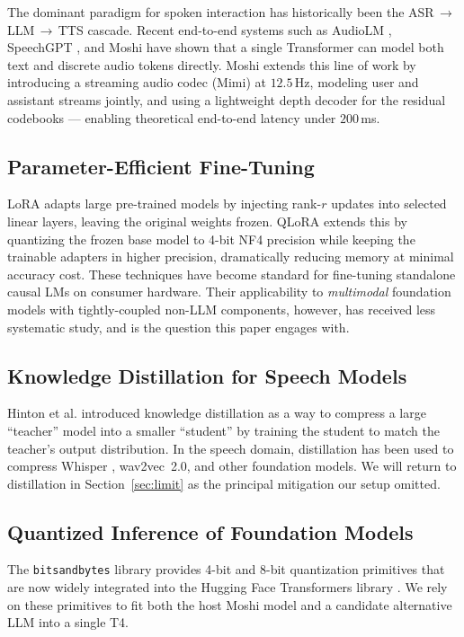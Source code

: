 \documentclass[conference]{IEEEtran}
\begin{document}
The dominant paradigm for spoken interaction has historically been the ASR\,$\to$\,LLM\,$\to$\,TTS cascade. Recent end-to-end systems such as AudioLM \cite{audiolm2023}, SpeechGPT \cite{speechgpt2023}, and Moshi \cite{moshi2024} have shown that a single Transformer can model both text and discrete audio tokens directly. Moshi extends this line of work by introducing a streaming audio codec (Mimi) at $12.5$\,Hz, modeling user and assistant streams jointly, and using a lightweight depth decoder for the residual codebooks --- enabling theoretical end-to-end latency under $200$\,ms.

\subsection{Parameter-Efficient Fine-Tuning}

LoRA \cite{lora2021} adapts large pre-trained models by injecting rank-$r$ updates into selected linear layers, leaving the original weights frozen. QLoRA \cite{qlora2023} extends this by quantizing the frozen base model to 4-bit NF4 precision while keeping the trainable adapters in higher precision, dramatically reducing memory at minimal accuracy cost. These techniques have become standard for fine-tuning standalone causal LMs on consumer hardware. Their applicability to \emph{multimodal} foundation models with tightly-coupled non-LLM components, however, has received less systematic study, and is the question this paper engages with.

\subsection{Knowledge Distillation for Speech Models}

Hinton et al. \cite{kd2015} introduced knowledge distillation as a way to compress a large ``teacher'' model into a smaller ``student'' by training the student to match the teacher's output distribution. In the speech domain, distillation has been used to compress Whisper \cite{whisper2023}, wav2vec~2.0, and other foundation models. We will return to distillation in Section~\ref{sec:limit} as the principal mitigation our setup omitted.

\subsection{Quantized Inference of Foundation Models}

The \texttt{bitsandbytes} library \cite{bitsandbytes2022} provides 4-bit and 8-bit quantization primitives that are now widely integrated into the Hugging Face Transformers library \cite{transformers2020}. We rely on these primitives to fit both the host Moshi model and a candidate alternative LLM into a single T4.
\end{document}
